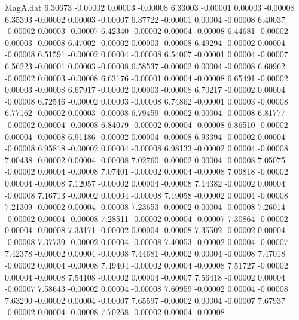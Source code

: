 \begin{filecontents}{MagA.dat}
   6.30673   -0.00002    0.00003   -0.00008
   6.33003   -0.00001    0.00003   -0.00008
   6.35393   -0.00002    0.00003   -0.00007
   6.37722   -0.00001    0.00004   -0.00008
   6.40037   -0.00002    0.00003   -0.00007
   6.42340   -0.00002    0.00004   -0.00008
   6.44681   -0.00002    0.00003   -0.00008
   6.47002   -0.00002    0.00003   -0.00008
   6.49294   -0.00002    0.00004   -0.00008
   6.51591   -0.00002    0.00004   -0.00008
   6.54007   -0.00001    0.00004   -0.00007
   6.56223   -0.00001    0.00003   -0.00008
   6.58537   -0.00002    0.00004   -0.00008
   6.60962   -0.00002    0.00003   -0.00008
   6.63176   -0.00001    0.00004   -0.00008
   6.65491   -0.00002    0.00003   -0.00008
   6.67917   -0.00002    0.00003   -0.00008
   6.70217   -0.00002    0.00004   -0.00008
   6.72546   -0.00002    0.00003   -0.00008
   6.74862   -0.00001    0.00003   -0.00008
   6.77162   -0.00002    0.00003   -0.00008
   6.79459   -0.00002    0.00004   -0.00008
   6.81777   -0.00002    0.00004   -0.00008
   6.84079   -0.00002    0.00004   -0.00008
   6.86510   -0.00002    0.00004   -0.00008
   6.91186   -0.00002    0.00004   -0.00008
   6.93394   -0.00002    0.00004   -0.00008
   6.95818   -0.00002    0.00004   -0.00008
   6.98133   -0.00002    0.00004   -0.00008
   7.00438   -0.00002    0.00004   -0.00008
   7.02760   -0.00002    0.00004   -0.00008
   7.05075   -0.00002    0.00004   -0.00008
   7.07401   -0.00002    0.00004   -0.00008
   7.09818   -0.00002    0.00004   -0.00008
   7.12057   -0.00002    0.00004   -0.00008
   7.14382   -0.00002    0.00004   -0.00008
   7.16713   -0.00002    0.00004   -0.00008
   7.19058   -0.00002    0.00004   -0.00008
   7.21309   -0.00002    0.00004   -0.00008
   7.23653   -0.00002    0.00004   -0.00008
   7.26014   -0.00002    0.00004   -0.00008
   7.28511   -0.00002    0.00004   -0.00007
   7.30864   -0.00002    0.00004   -0.00008
   7.33171   -0.00002    0.00004   -0.00008
   7.35502   -0.00002    0.00004   -0.00008
   7.37739   -0.00002    0.00004   -0.00008
   7.40053   -0.00002    0.00004   -0.00007
   7.42378   -0.00002    0.00004   -0.00008
   7.44681   -0.00002    0.00004   -0.00008
   7.47018   -0.00002    0.00004   -0.00008
   7.49404   -0.00002    0.00004   -0.00008
   7.51727   -0.00002    0.00004   -0.00008
   7.54108   -0.00002    0.00004   -0.00007
   7.56418   -0.00002    0.00004   -0.00007
   7.58643   -0.00002    0.00004   -0.00008
   7.60959   -0.00002    0.00004   -0.00008
   7.63290   -0.00002    0.00004   -0.00007
   7.65597   -0.00002    0.00004   -0.00007
   7.67937   -0.00002    0.00004   -0.00008
   7.70268   -0.00002    0.00004   -0.00008

\end{filecontents}
